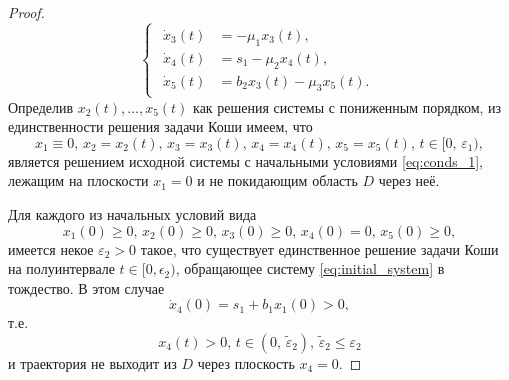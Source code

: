 \documentclass[14pt,a4paper]{extarticle}
\begin{document}
\begin{proof}
\begin{equation*}
\begin{cases}
\begin{aligned}
					\dot{x}_3(t) &= -\mu_1x_3(t),\\
					\dot{x}_4(t) &= s_1 - \mu_2x_4(t),\\
					\dot{x}_5(t) &= b_2x_3(t)-\mu_3x_5(t).
				\end{aligned}
			\end{cases}
		\end{equation*} 
		Определив $x_2(t),\dots,x_5(t)$ как решения системы с пониженным порядком, из единственности решения задачи Коши имеем, что
		\[x_1\equiv0,\, x_2=x_2(t),\, x_3=x_3(t),\, x_4=x_4(t),\, x_5=x_5(t),\, t\in[0,\,\varepsilon_1),\]
		является решением исходной системы с начальными условиями \ref{eq:conds_1}, лежащим на плоскости $x_1=0$ и не покидающим область $D$ через неё.
		
		
		
		Для каждого из начальных условий вида
		\begin{equation*}
			x_1(0)\ge0,\, x_2(0)\ge0,\, x_3(0)\ge0,\, x_4(0)=0,\, x_5(0)\ge0,
		\end{equation*}
		имеется некое $\varepsilon_2>0$ такое, что существует единственное решение задачи Коши на полуинтервале $t\in[0,\epsilon_2)$, обращающее систему \ref{eq:initial_system} в тождество. В этом случае 
		\[\dot{x}_4(0)=s_1+b_1x_1(0)>0,\]
		т.е. 
		\[x_4(t)>0,\, t\in(0,\, \tilde{\varepsilon}_2),\,\tilde{\varepsilon}_2\le\varepsilon_2\]
		и траектория не выходит из $D$ через плоскость $x_4=0$.
		
		

\end{proof}
\end{document}

